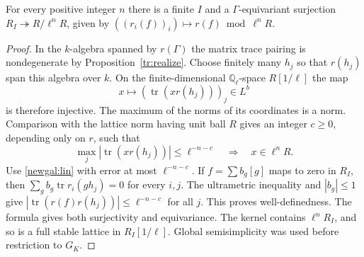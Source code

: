 \begin{lemma}\label{newgal:quot}
For every positive integer $n$ there is a finite $I$ and a
$\Gamma$-equivariant surjection $R_I\twoheadrightarrow R/\ell^nR$,
given by $((r_i(f))_i)\mapsto r(f)\bmod\ell^nR$.
\end{lemma}
\begin{proof}
In the $k$-algebra spanned by $r(\Gamma)$ the matrix trace pairing is
nondegenerate by Proposition~\ref{tr:realize}. Choose finitely many $h_j$
so that $r(h_j)$ span this algebra over $k$. On the finite-dimensional
$\mathbb Q_\ell$-space $R[1/\ell]$ the map
\[
   x\longmapsto(\operatorname{tr}(xr(h_j)))_j\in L^b
\]
is therefore injective. The maximum of the norms of its coordinates is
a norm. Comparison with the lattice norm having unit ball $R$ gives an
integer $c\ge0$, depending only on $r$, such that
\[
 \max_j|\operatorname{tr}(xr(h_j))|\le\ell^{-n-c}
       \quad\Longrightarrow\quad x\in\ell^n R.
\]
Use \eqref{newgal:lin} with error at most $\ell^{-n-c}$.
If $f=\sum b_g[g]$ maps to zero in $R_I$, then
$\sum_g b_g\operatorname{tr} r_i(gh_j)=0$ for every $i,j$.
The ultrametric inequality and $|b_g|\le1$ give
$|\operatorname{tr}(r(f)r(h_j))|\le\ell^{-n-c}$ for all $j$.
This proves well-definedness. The formula gives both surjectivity and
equivariance. The kernel contains $\ell^nR_I$, and so is a full stable
lattice in $R_I[1/\ell]$. Global semisimplicity was used before restriction
to $G_K$.
\end{proof}

